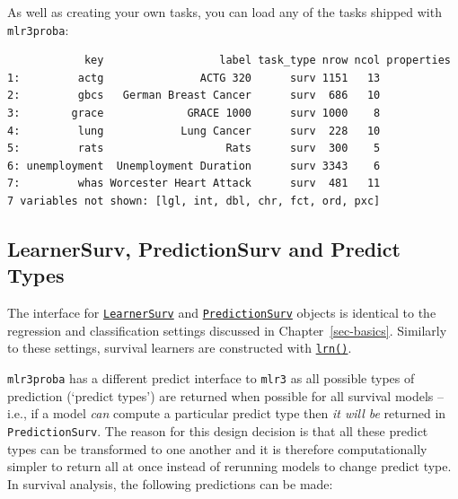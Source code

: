 As well as creating your own tasks, you can load any of the tasks
shipped with \texttt{mlr3proba}:

\begin{Shaded}
\begin{Highlighting}[]
\NormalTok{(mlr\_tasks)[task\_type }\SpecialCharTok{==} \NormalTok{]}
\end{Highlighting}
\end{Shaded}

\begin{verbatim}
            key                  label task_type nrow ncol properties
1:         actg               ACTG 320      surv 1151   13           
2:         gbcs   German Breast Cancer      surv  686   10           
3:        grace             GRACE 1000      surv 1000    8           
4:         lung            Lung Cancer      surv  228   10           
5:         rats                   Rats      surv  300    5           
6: unemployment  Unemployment Duration      surv 3343    6           
7:         whas Worcester Heart Attack      surv  481   11           
7 variables not shown: [lgl, int, dbl, chr, fct, ord, pxc]
\end{verbatim}

\hypertarget{learnersurv-predictionsurv-and-predict-types}{%
\subsection{LearnerSurv, PredictionSurv and Predict
Types}\label{learnersurv-predictionsurv-and-predict-types}}

The interface for
\href{https://mlr3proba.mlr-org.com/reference/LearnerSurv.html}{\texttt{LearnerSurv}}
and
\href{https://mlr3proba.mlr-org.com/reference/PredictionSurv.html}{\texttt{PredictionSurv}}
objects is identical to the regression and classification settings
discussed in Chapter~\ref{sec-basics}. Similarly to these settings,
survival learners are constructed with
\href{https://mlr3.mlr-org.com/reference/mlr_sugar.html}{\texttt{lrn()}}.

\texttt{mlr3proba} has a different predict interface to \texttt{mlr3} as
all possible types of prediction (`predict types') are returned when
possible for all survival models -- i.e., if a model \emph{can} compute
a particular predict type then \emph{it will be} returned in
\texttt{PredictionSurv}. The reason for this design decision is that all
these predict types can be transformed to one another and it is
therefore computationally simpler to return all at once instead of
rerunning models to change predict type. In survival analysis, the
following predictions can be made:

